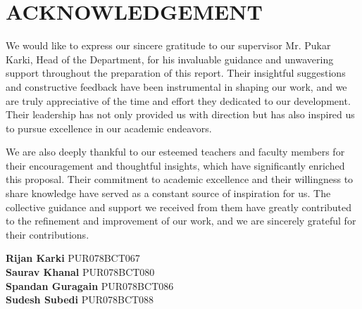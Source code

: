 \chapter*{ACKNOWLEDGEMENT}

We would like to express our sincere gratitude to our supervisor Mr. Pukar Karki, Head of the Department, for his invaluable guidance and unwavering support throughout the preparation of this report. Their insightful suggestions and constructive feedback have been instrumental in shaping our work, and we are truly appreciative of the time and effort they dedicated to our development. Their leadership has not only provided us with direction but has also inspired us to pursue excellence in our academic endeavors.

We are also deeply thankful to our esteemed teachers and faculty members for their encouragement and thoughtful insights, which have significantly enriched this proposal. Their commitment to academic excellence and their willingness to share knowledge have served as a constant source of inspiration for us. The collective guidance and support we received from them have greatly contributed to the refinement and improvement of our work, and we are sincerely grateful for their contributions.

\vspace{1cm}
\textbf{Rijan Karki} 
PUR078BCT067\\
\textbf{Saurav Khanal} 
PUR078BCT080\\
\textbf{Spandan Guragain} 
PUR078BCT086\\
\textbf{Sudesh Subedi} 
PUR078BCT088\\
